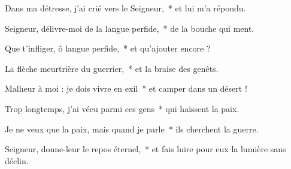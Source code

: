 \item Dans ma détresse, j'ai crié vers le Seigneur,~* et lui m'a répondu.

\item Seigneur, délivre-moi de la langue perfide,~* de la bouche qui ment.

\item Que t'infliger, ô langue perfide,~* et qu'ajouter encore ?

\item La flèche meurtrière du guerrier,~* et la braise des genêts.

\item Malheur à moi : je dois vivre en exil~* et camper dans un désert !

\item Trop longtemps, j'ai vécu parmi ces gens~* qui haïssent la paix.

\item Je ne veux que la paix, mais quand je parle~* ils cherchent la guerre.

\item Seigneur, donne-leur le repos éternel,~* et fais luire pour eux la lumière sans déclin.